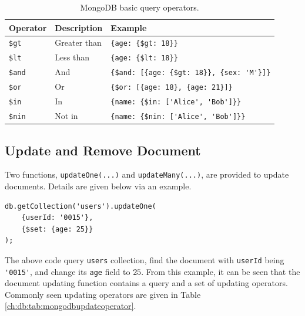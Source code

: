 \begin{table}
	\centering \caption{MongoDB basic query operators.} \label{ch:db:tab:mongodbqueryoperator}
	\begin{tabularx}{\textwidth}{llX}
		\hline
		Operator & Description & Example \\ \hline
		\verb|$gt| & Greater than & \verb|{age: {$gt: 18}}| \\ \hdashline
		\verb|$lt| & Less than & \verb|{age: {$lt: 18}}| \\ \hdashline
		\verb|$and| & And & \verb|{$and: [{age: {$gt: 18}}, {sex: 'M'}]}| \\ \hdashline
		\verb|$or| & Or &  \verb|{$or: [{age: 18}, {age: 21}]}| \\ \hdashline
		\verb|$in| & In & \verb|{name: {$in: ['Alice', 'Bob']}}| \\ \hdashline
		\verb|$nin| & Not in & \verb|{name: {$nin: ['Alice', 'Bob']}}| \\
		\hline
	\end{tabularx}
\end{table}

\subsection{Update and Remove Document}

Two functions, \verb|updateOne(...)| and \verb|updateMany(...)|, are provided to update documents. Details are given below via an example.
\begin{lstlisting}
db.getCollection('users').updateOne(
	{userId: '0015'},
	{$set: {age: 25}}
);
\end{lstlisting}
The above code query \verb|users| collection, find the document with \verb|userId| being \verb|'0015'|, and change its \verb|age| field to $25$. From this example, it can be seen that the document updating function contains a query and a set of updating operators. Commonly seen updating operators are given in Table \ref{ch:db:tab:mongodbupdateoperator}.

